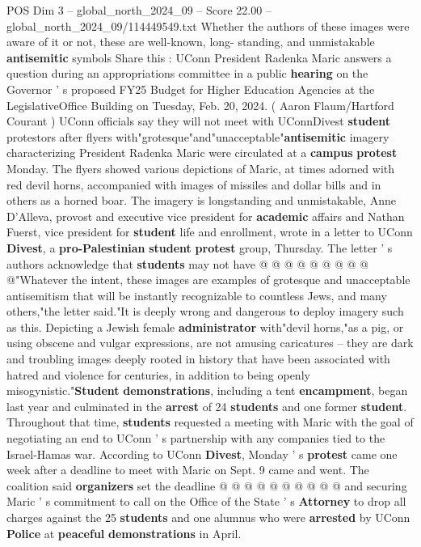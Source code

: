 \begin{textsample}{POS Dim 3 – global\_north\_2024\_09 – Score 22.00 – global\_north\_2024\_09/114449549.txt}  \label{ex:f3_pos_160}
Whether the authors of these images were aware of it or not, these are well-known, long- standing, and unmistakable \textbf{antisemitic} symbols Share this : UConn President Radenka Maric answers a question during an appropriations committee in a public \textbf{hearing} on the Governor ' s proposed FY25 Budget for Higher Education Agencies at the LegislativeOffice Building on Tuesday, Feb. 20, 2024. ( Aaron Flaum/Hartford Courant ) UConn officials say they will not meet with UConnDivest \textbf{student} protestors after flyers with"grotesque"and"unacceptable"\textbf{antisemitic} imagery characterizing President Radenka Maric were circulated at a \textbf{campus} \textbf{protest} Monday.
The flyers showed various depictions of Maric, at times adorned with red devil horns, accompanied with images of missiles and dollar bills and in others as a horned boar.
The imagery is longstanding and unmistakable, Anne D'Alleva, provost and executive vice president for \textbf{academic} affairs and Nathan Fuerst, vice president for \textbf{student} life and enrollment, wrote in a letter to UConn \textbf{Divest}, a \textbf{pro-Palestinian} \textbf{student} \textbf{protest} group, Thursday.
The letter ' s authors acknowledge that \textbf{students} may not have @ @ @ @ @ @ @ @ @ @"Whatever the intent, these images are examples of grotesque and unacceptable antisemitism that will be instantly recognizable to countless Jews, and many others,"the letter said."It is deeply wrong and dangerous to deploy imagery such as this.
Depicting a Jewish female \textbf{administrator} with"devil horns,"as a pig, or using obscene and vulgar expressions, are not amusing caricatures -- they are dark and troubling images deeply rooted in history that have been associated with hatred and violence for centuries, in addition to being openly misogynistic."\textbf{Student} \textbf{demonstrations}, including a tent \textbf{encampment}, began last year and culminated in the \textbf{arrest} of 24 \textbf{students} and one former \textbf{student}.
Throughout that time, \textbf{students} requested a meeting with Maric with the goal of negotiating an end to UConn ' s partnership with any companies tied to the Israel-Hamas war.
According to UConn \textbf{Divest}, Monday ' s \textbf{protest} came one week after a deadline to meet with Maric on Sept. 9 came and went.
The coalition said \textbf{organizers} set the deadline @ @ @ @ @ @ @ @ @ @ and securing Maric ' s commitment to call on the Office of the State ' s \textbf{Attorney} to drop all charges against the 25 \textbf{students} and one alumnus who were \textbf{arrested} by UConn \textbf{Police} at \textbf{peaceful} \textbf{demonstrations} in April.

\end{textsample}
